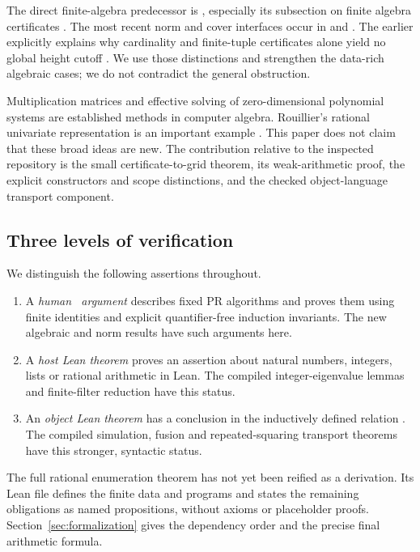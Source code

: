 The direct finite-algebra predecessor is
,
especially its subsection on finite algebra certificates
\cite{Embedding}. The most recent norm and cover interfaces occur in
 and 
\cite{Demand,Coherent}. The earlier
 explicitly explains
why cardinality and finite-tuple certificates alone yield no global
height cutoff \cite{Observation}. We use those distinctions and
strengthen the data-rich algebraic cases; we do not contradict the
general obstruction.

Multiplication matrices and effective solving of zero-dimensional
polynomial systems are established methods in computer algebra.
Rouillier's rational univariate representation is an important example
\cite{Rouillier}. This paper does not claim that these broad ideas are
new. The contribution relative to the inspected repository is the
small certificate-to-grid theorem, its weak-arithmetic proof,
the explicit constructors and scope distinctions, and the checked
object-language transport component.

\subsection{Three levels of verification}

We distinguish the following assertions throughout.
\begin{enumerate}
\item A \emph{human \ipra\ argument} describes fixed PR algorithms and
proves them using finite identities and explicit quantifier-free
induction invariants. The new algebraic and norm results have such
arguments here.
\item A \emph{host Lean theorem} proves an assertion about natural
numbers, integers, lists or rational arithmetic in Lean. The compiled
integer-eigenvalue lemmas and finite-filter reduction have this status.
\item An \emph{object Lean theorem} has a conclusion in the inductively
defined relation . The compiled simulation, fusion and
repeated-squaring transport theorems have this stronger, syntactic status.
\end{enumerate}
The full rational enumeration theorem has not yet been reified as a
 derivation. Its Lean file defines the finite data and
programs and states the remaining obligations as named propositions,
without axioms or placeholder proofs. Section~\ref{sec:formalization}
gives the dependency order and the precise final arithmetic formula.

